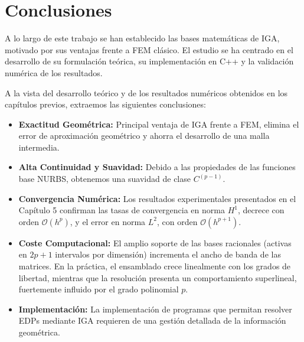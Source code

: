 \documentclass[11pt]{book}
\newcommand{\clearemptydoublepage}{\newpage{\pagestyle{empty}\cleardoublepage}}
\theoremstyle{plain} %
\theoremstyle{definition} %
\theoremstyle{definition} %
\begin{document}
\clearemptydoublepage
\vspace{-0.2cm}
\chapter{Conclusiones}\label{chap5}
\vspace{-1cm}

A lo largo de este trabajo se han establecido las bases matemáticas de IGA, motivado por sus ventajas frente a FEM clásico. El estudio se ha centrado en el desarrollo de su formulación teórica, su implementación en C++ y la validación numérica de los resultados.

A la vista del desarrollo teórico y de los resultados numéricos obtenidos en los capítulos previos, extraemos las siguientes conclusiones:
\vspace{-0.3cm}

\begin{itemize}
    \item \textbf{Exactitud Geométrica:} Principal ventaja de IGA frente a FEM, elimina el error de aproximación geométrico y ahorra el desarrollo de una malla intermedia.

    \vspace{-0.2cm}


    \item \textbf{Alta Continuidad y Suavidad:} Debido a las propiedades de las funciones base NURBS, obtenemos una suavidad de clase $C^{(p-1)}$.

\vspace{-0.2cm}


    \item \textbf{Convergencia Numérica:} Los resultados experimentales presentados en el Capítulo 5 confirman las tasas de convergencia en norma $H^1$, decrece con orden $\mathcal{O}(h^p)$, y el error en norma $L^2$, con orden $\mathcal{O}(h^{p+1})$.

\vspace{-0.2cm}


    \item \textbf{Coste Computacional:} El amplio soporte de las bases racionales (activas en $2p+1$ intervalos por dimensión) incrementa el ancho de banda de las matrices. En la práctica, el ensamblado crece linealmente con los grados de libertad, mientras que la resolución presenta un comportamiento superlineal, fuertemente influido por el grado polinomial $p$.

    \vspace{-0.2cm}


    \item \textbf{Implementación:} La implementación de programas que permitan resolver EDPs mediante IGA requieren de una gestión detallada de la información geométrica.
\end{itemize}
\vspace{-0.5cm}
\end{document}
